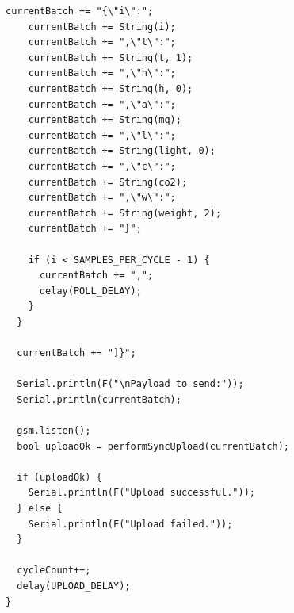 \documentclass[../main.tex]{subfiles}
\begin{document}
\begin{lstlisting}[style=customc,]
    currentBatch += "{\"i\":";
    currentBatch += String(i);
    currentBatch += ",\"t\":";
    currentBatch += String(t, 1);
    currentBatch += ",\"h\":";
    currentBatch += String(h, 0);
    currentBatch += ",\"a\":";
    currentBatch += String(mq);
    currentBatch += ",\"l\":";
    currentBatch += String(light, 0);
    currentBatch += ",\"c\":";
    currentBatch += String(co2);
    currentBatch += ",\"w\":";
    currentBatch += String(weight, 2);
    currentBatch += "}";

    if (i < SAMPLES_PER_CYCLE - 1) {
      currentBatch += ",";
      delay(POLL_DELAY);
    }
  }

  currentBatch += "]}";

  Serial.println(F("\nPayload to send:"));
  Serial.println(currentBatch);

  gsm.listen();
  bool uploadOk = performSyncUpload(currentBatch);

  if (uploadOk) {
    Serial.println(F("Upload successful."));
  } else {
    Serial.println(F("Upload failed."));
  }

  cycleCount++;
  delay(UPLOAD_DELAY);
}
\end{lstlisting}
\end{document}
